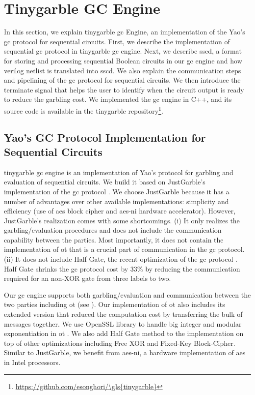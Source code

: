 \chapter{Tinygarble GC Engine}\label{chap:engine}
In this section, we explain \gls{tinygarble} \acrshort{gc} Engine, an implementation of the Yao's \acrshort{gc} protocol for sequential circuits.
First, we describe the implementation of sequential \acrshort{gc} protocol in \gls{tinygarble} \acrshort{gc} engine.
Next, we describe \acrfull{sscd}, a format for storing and processing sequential Boolean circuits in our \acrshort{gc} engine and how \gls{verilog} \gls{netlist} is translated into \acrshort{sscd}.
We also explain the communication steps and pipelining of the \acrshort{gc} protocol for sequential circuits.
We then introduce the terminate signal that helps the user to identify when the circuit output is ready to reduce the garbling cost.
We implemented the \acrshort{gc} engine in C++, and its source code is available in the \gls{tinygarble} repository\footnote{\url{https://github.com/esonghori/\gls{tinygarble}}}.

\section{Yao's GC Protocol Implementation for Sequential Circuits} \label{sec:engine-gc}
\gls{tinygarble} \acrshort{gc} engine is an implementation of Yao's protocol for garbling and evaluation of sequential circuits.
We build it based on JustGarble's implementation of the \acrshort{gc} protocol \cite{bellare2013efficient}.
We choose JustGarble because it has a number of advantages over other available implementations: simplicity and efficiency (use of \acrshort{aes} block cipher and \acrshort{aes-ni} hardware accelerator).
However, JustGarble's realization comes with some shortcomings.
(i) It only realizes the garbling/evaluation procedures and does not include the communication capability between the parties.
Most importantly, it does not contain the implementation of \acrshort{ot} that is a crucial part of communication in the \acrshort{gc} protocol.
(ii) It does not include Half Gate, the recent optimization of the \acrshort{gc} protocol \cite{zahur2015two}.
Half Gate shrinks the \acrshort{gc} protocol cost by 33\% by reducing the communication required for an non-XOR gate from three labels to two.

Our \acrshort{gc} engine supports both garbling/evaluation and communication between the two parties including \acrshort{ot} (see ).
Our implementation of \acrshort{ot} also includes its extended version \cite{husted2013gpu} that reduced the computation cost by transferring the bulk of messages together.
We use OpenSSL library to handle big integer and modular exponentiation in \acrshort{ot} \cite{viega2002network}.
We also add Half Gate method to the implementation on top of other optimizations including Free XOR and Fixed-Key Block-Cipher.
Similar to JustGarble, we benefit from \acrshort{aes-ni}, a hardware implementation of \acrshort{aes} in Intel processors.

